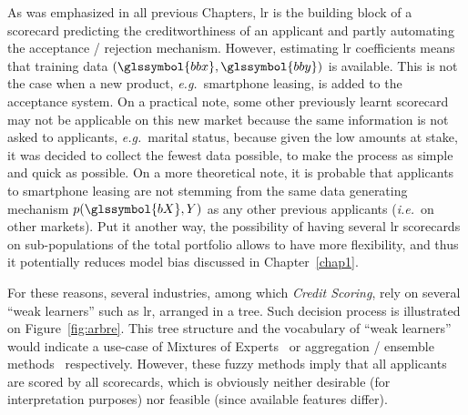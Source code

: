As was emphasized in all previous Chapters, \gls{lr} is the building block of a scorecard predicting the creditworthiness of an applicant and partly automating the acceptance / rejection mechanism. However, estimating \gls{lr} coefficients means that training data $(\glssymbol{bbx},\glssymbol{bby})$ is available. This is not the case when a new product, \textit{e.g.}\ smartphone leasing, is added to the acceptance system. On a practical note, some other previously learnt scorecard may not be applicable on this new market because the same information is not asked to applicants, \textit{e.g.}\ marital status, because given the low amounts at stake, it was decided to collect the fewest data possible, to make the process as simple and quick as possible. On a more theoretical note, it is probable that applicants to smartphone leasing are not stemming from the same data generating mechanism $p(\glssymbol{bX},Y)$ as any other previous applicants (\textit{i.e.}\ on other markets). Put it another way, the possibility of having several \gls{lr} scorecards on sub-populations of the total portfolio allows to have more flexibility, and thus it potentially reduces model bias discussed in Chapter~\ref{chap1}.




For these reasons, several industries, among which \textit{Credit Scoring}, rely on several ``weak learners'' such as \gls{lr}, arranged in a tree. Such decision process is illustrated on Figure~\ref{fig:arbre}. This tree structure and the vocabulary of ``weak learners'' would indicate a use-case of Mixtures of Experts~\cite{jordan1994hierarchical} or aggregation / ensemble methods~\cite{opitz1999popular} respectively. However, these fuzzy methods imply that all applicants are scored by all scorecards, which is obviously neither desirable (for interpretation purposes) nor feasible (since available features differ).

